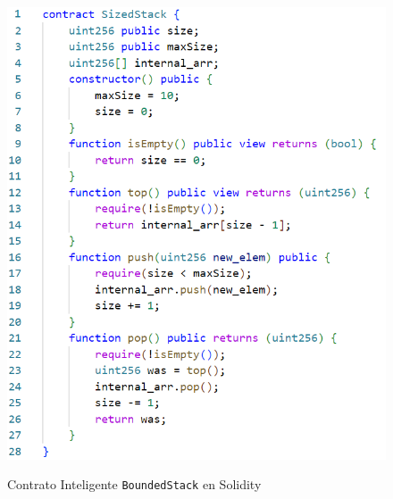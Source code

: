 \begin{figure}
    \centering
    {\includegraphics[width=\textwidth]{figs/bounded-stack.png}}
    \caption{Contrato Inteligente \texttt{BoundedStack} en Solidity}
    \label{fig:bounded-stack}
\end{figure}

